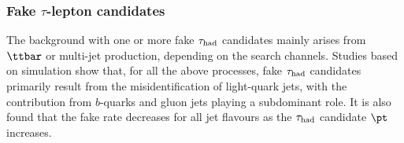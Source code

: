 



\subsubsection{Fake $\tau$-lepton candidates}
\label{sec:faketaus}
The background with one or more fake $\tau_{\mathrm{had}}$ candidates mainly arises from $\ttbar$ or
multi-jet production, depending on the search channels.
Studies based on simulation show that, for all the above processes, fake $\tau_{\mathrm{had}}$ candidates primarily result from the
misidentification of light-quark jets, with the contribution from $b$-quarks and gluon jets playing a subdominant role.
It is also found that the fake rate decreases for all jet flavours as the $\tau_{\mathrm{had}}$ candidate $\pt$ increases.


